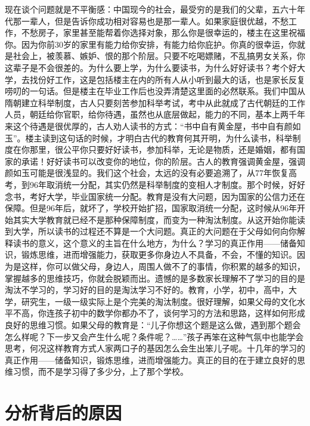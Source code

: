 现在谈个问题就是不平衡感：中国现今的社会，最受穷的是我们的父辈，五六十年代那一辈人，但是告诉你成功相对容易也是那一辈人。如果家庭很优越，不愁工作，不愁房子，家里甚至能帮着你选择对象，那么你是很幸运的，楼主在这里祝福你。因为你前30岁的家里有能力给你安排，有能力给你庇护。你真的很幸运，你就是社会上，被羡慕、嫉妒、恨的那个阶层。只要不吃喝嫖赌，不乱搞男女关系，你这辈子是不会很差的。为什么要上学，为什么要读书，为什么好好读书？考个好大学，去找份好工作，这是包括楼主在内的所有人从小听到最大的话，也是家长反复唠叨的一句话。但是楼主在毕业工作后也没弄清楚这里面的必然联系。我们中国从隋朝建立科举制度，古人只要刻苦参加科举考试，考中从此就成了古代朝廷的工作人员，朝廷给你官职，给你待遇，虽然也从底层做起，能力的不同，基本上两千年来这个待遇是很优厚的，古人劝人读书的方式：“书中自有黄金屋，书中自有颜如玉”。楼主读到这句话的时候，才明白古代的教育何其开明，为什么读书，科举制度在你那里，很公平你只要好好读书，参加科举，无论是物质，还是婚姻，都有国家的承诺！好好读书可以改变你的地位，你的阶层。古人的教育强调黄金屋，强调颜如玉可能是很浅显的。我们这个社会，太远的没有必要追溯了，从77年恢复高考，到96年取消统一分配，其实仍然是科举制度的变相人才制度。那个时候，好好念书，考好大学，毕业国家统一分配。教育是没有大问题，因为国家的公信力还在保障。但是96年后，就坏了，学校开始扩招，国家取消统一分配，这时候从96年开始其实大学教育就已经不是那种保障制度，而变为一种淘汰制度。从这开始你能读到大学，所以读书的过程还不算是一个大问题。真正的大问题在于父母如何向你解释读书的意义，这个意义的主旨在什么地方，为什么？学习的真正作用——储备知识，锻炼思维，进而增强能力，获取更多你身边人不具备，不会，不懂的知识。因为是这样，你可以做父母，身边人，周围人做不了的事情，你积累的越多的知识，掌握越多的思维技巧，你就会脱颖而出。遗憾的是多数家长理解不了学习的目的是淘汰不学习的，学习好的目的是淘汰学习不好的。教育，小学，初中，高中，大学，研究生，一级一级实际上是个完美的淘汰制度。很好理解，如果父母的文化水平不高，你连孩子初中的数学你都办不了，谈何学习的方法和思路，这样如何形成良好的思维习惯。如果父母的教育是：“儿子你想这个题是这么做，遇到那个题会怎么样呢？下一步又会产生什么呢？条件呢？……”孩子再笨在这种气氛中也能学会思考，何况这样教育方式人家两口子的基因怎么会生出笨儿子呢。十几年的学习的真正作用——储备知识，锻炼思维，进而增强能力。真正的目的在于建立良好的思维习惯，而不是学习得了多少分，上了那个学校。

\section{分析背后的原因}


